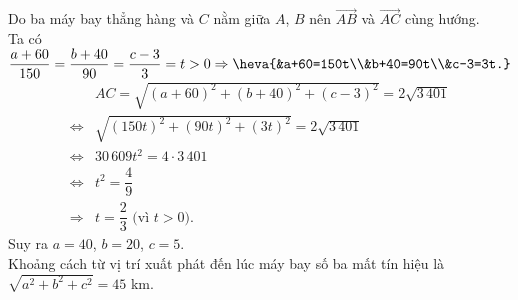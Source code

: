 \begin{bt}
{		Do ba máy bay thẳng hàng và $C$ nằm giữa $A$, $B$ nên $\overrightarrow{AB}$ và $\overrightarrow{AC}$ cùng hướng.\\
		Ta có $\dfrac{a+60}{150}=\dfrac{b+40}{90}=\dfrac{c-3}{3}=t>0\Rightarrow \heva{&a+60=150t\\&b+40=90t\\&c-3=3t.}$
		\allowdisplaybreaks
		\begin{align*}
			&A C=\sqrt{(a+60)^2+(b+40)^2+(c-3)^2}=2 \sqrt{3\,401}\\
			\Leftrightarrow &\sqrt{(150 t)^2+(90 t)^2+(3 t)^2}=2 \sqrt{3\,401} \\
			\Leftrightarrow &30\,609 t^2=4 \cdot 3\,401\\
			\Leftrightarrow & t^2=\dfrac{4}{9} \\
			\Rightarrow &t=\dfrac{2}{3} \text{ (vì $t>0$)}.
		\end{align*}
		Suy ra $a=40$, $b=20$, $c=5$.\\
		Khoảng cách từ vị trí xuất phát đến lúc máy bay số ba mất tín hiệu là $\sqrt{a^2+b^2+c^2}=45$ km.
		
	}
\end{bt}

